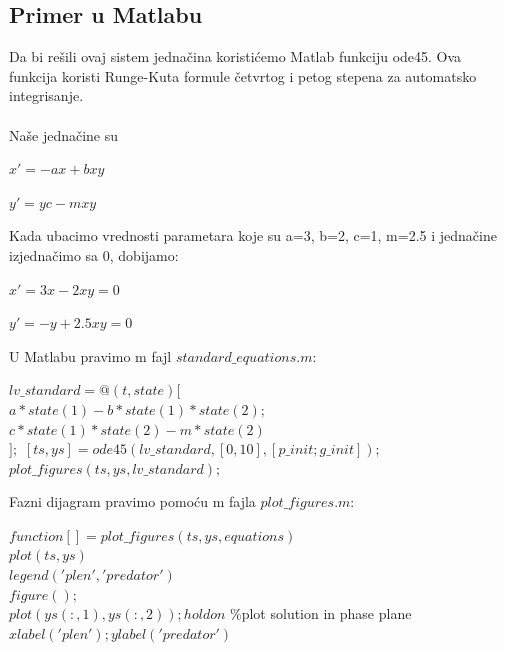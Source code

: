 \documentclass[a4paper]{article}
\begin{document}
\subsection{Primer u Matlabu}
\label{sub:std_primer}
Da bi rešili ovaj sistem jednačina koristićemo Matlab funkciju ode45. Ova funkcija koristi Runge-Kuta
formule četvrtog i petog stepena za automatsko integrisanje.\\ \\
 Naše jednačine su 
	\begin{center}
		$x' = -ax + bxy$
	\end{center}
	\begin{center}
		$y' =yc - mxy$
	\end{center}
Kada ubacimo vrednosti parametara koje su a=3, b=2, c=1, m=2.5 i jednačine izjednačimo sa 0, dobijamo:
	\begin{center}
		$x'=3x - 2xy = 0$
	\end{center}
	\begin{center}
		$y'=-y + 2.5xy = 0$
	\end{center}
U Matlabu pravimo m fajl $ standard\_equations.m $:
\begin{flushleft}
	$lv\_standard = @(t, state) [$ \\
  	$  a * state(1) - b * state(1) * state(2);$\\
	$    c * state(1) * state(2) - m * state(2)$\\
	$    ];$
	$[ts, ys] = ode45(lv\_standard, [0, 10], [p\_init;g\_init]);$
	$plot\_figures(ts, ys, lv\_standard);$
\end{flushleft}
Fazni dijagram pravimo pomoću m fajla $ plot\_figures.m $:
\begin{flushleft}
	$function [] = plot\_figures(ts, ys, equations)$\\
   	$plot(ts, ys)$\\
   	$legend('plen', 'predator')$\\
   	$figure();$\\
   	$plot(ys(:,1),ys(:,2)); hold on$           \hspace{2cm}\%plot solution in phase plane \\
   	$xlabel('plen'); ylabel('predator')$
\end{flushleft} 
\end{document}

